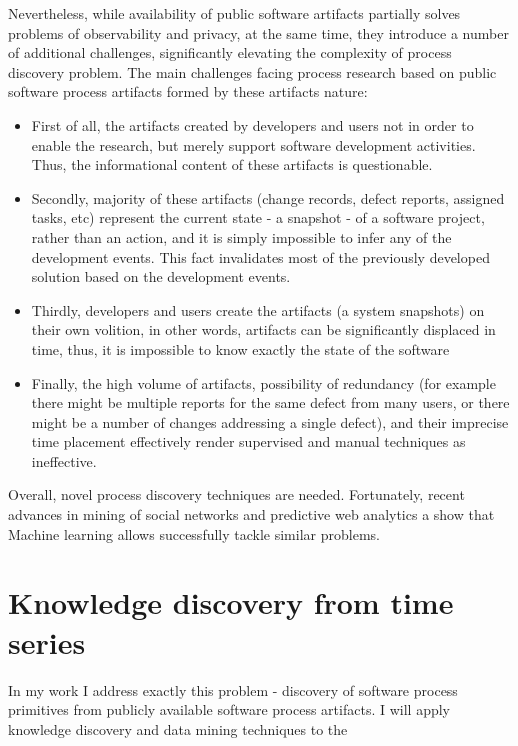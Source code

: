 Nevertheless, while availability of public software artifacts partially solves problems of observability and privacy, 
at the same time, they introduce a number of additional challenges, significantly elevating the complexity 
of process discovery problem. The main challenges facing process research based on public software process 
artifacts formed by these  artifacts nature:
\begin{itemize}
 \item First of all, the artifacts created by developers and users not in order to enable the research, but merely 
          support software development activities. Thus, the informational content of these artifacts is questionable.
 \item Secondly, majority of these artifacts (change records, defect reports, assigned tasks, etc) represent the current 
          state - a snapshot - of a software project, rather than an action, and it is simply impossible to infer any of
          the development events. 
          This fact invalidates most of the previously developed solution based on the development events.
 \item Thirdly, developers and users create the artifacts (a system snapshots) on their own volition, in other words,
          artifacts can be significantly displaced in time, thus, it is impossible to know exactly the state of the software 
 \item Finally, the high volume of artifacts, possibility of redundancy (for example there might be multiple reports for 
          the same defect from many users, or there might be a number of changes addressing a single defect), and their 
          imprecise time placement effectively render supervised and manual techniques as ineffective. 
\end{itemize}

Overall, novel process discovery techniques are needed. Fortunately, recent advances in mining of social networks and 
predictive web analytics a show that Machine learning allows successfully tackle similar problems. 

\section{Knowledge discovery from time series}

In my work I address exactly this problem - discovery of software process primitives from publicly available 
software process artifacts. I will apply knowledge discovery and data mining techniques to the



